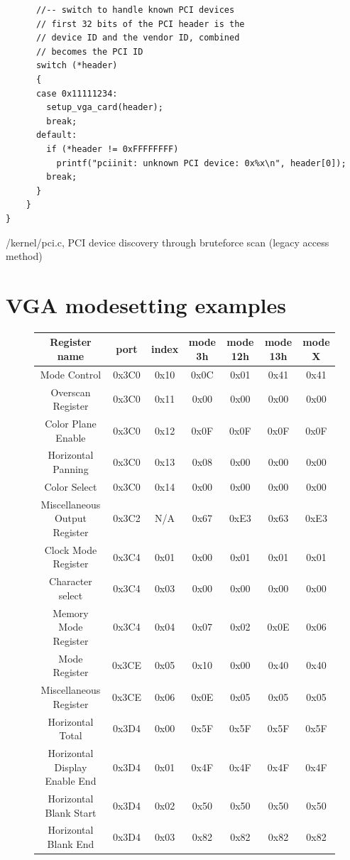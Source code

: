 \begin{appendices}
\begin{listing}[H]
\begin{verbatim}
      //-- switch to handle known PCI devices
      // first 32 bits of the PCI header is the
      // device ID and the vendor ID, combined
      // becomes the PCI ID
      switch (*header)
      {
      case 0x11111234:
        setup_vga_card(header);
        break;
      default:
        if (*header != 0xFFFFFFFF)
          printf("pciinit: unknown PCI device: 0x%x\n", header[0]);
        break;
      }
    }
}
    \end{verbatim}
    \caption{/kernel/pci.c, PCI device discovery through bruteforce scan (legacy access method)}
\end{listing}

\section{VGA modesetting examples}
\label{appendix:c:4}
\begin{figure}[H]
\begin{tabular}{|c|c|c|c|c|c|c|}
\hline
Register name&port&index&mode 3h&mode 12h&mode 13h&mode X\\
\hline\hline
Mode Control&0x3C0&0x10&0x0C&0x01&0x41&0x41\\
\hline
Overscan Register&0x3C0&0x11&0x00&0x00&0x00&0x00\\
\hline
Color Plane Enable&0x3C0&0x12&0x0F&0x0F&0x0F&0x0F\\
\hline
Horizontal Panning&0x3C0&0x13&0x08&0x00&0x00&0x00\\
\hline
Color Select&0x3C0&0x14&0x00&0x00&0x00&0x00\\
\hline
Miscellaneous Output Register&0x3C2&N/A&0x67&0xE3&0x63&0xE3\\
\hline
Clock Mode Register&0x3C4&0x01&0x00&0x01&0x01&0x01\\
\hline
Character select&0x3C4&0x03&0x00&0x00&0x00&0x00\\
\hline
Memory Mode Register&0x3C4&0x04&0x07&0x02&0x0E&0x06\\
\hline
Mode Register&0x3CE&0x05&0x10&0x00&0x40&0x40\\
\hline
Miscellaneous Register&0x3CE&0x06&0x0E&0x05&0x05&0x05\\
\hline
Horizontal Total&0x3D4&0x00&0x5F&0x5F&0x5F&0x5F\\
\hline
Horizontal Display Enable End&0x3D4&0x01&0x4F&0x4F&0x4F&0x4F\\
\hline
Horizontal Blank Start&0x3D4&0x02&0x50&0x50&0x50&0x50\\
\hline
Horizontal Blank End&0x3D4&0x03&0x82&0x82&0x82&0x82\\

\end{tabular}
\end{figure}
\end{appendices}
